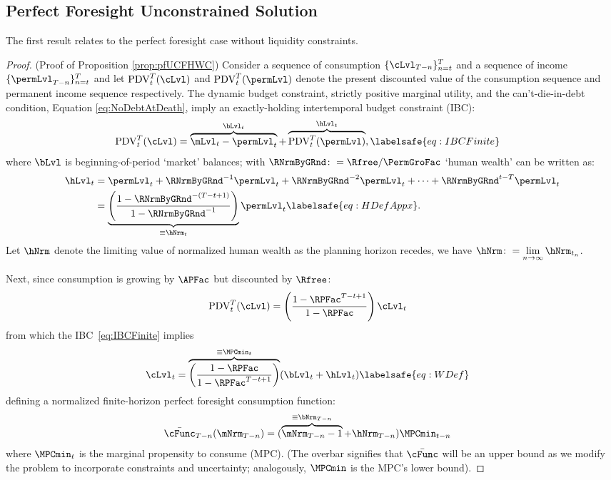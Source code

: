 \documentclass[\econtexRoot/BufferStockTheory]{subfiles}
\begin{document}
\subsection{Perfect Foresight Unconstrained Solution}\label{subsec:ApndxUCPF}

The first result relates to the perfect foresight case without liquidity constraints.


\begin{proof}(Proof of Proposition \ref{prop:pfUCFHWC})
Consider a sequence of consumption $\{\cLvl_{T-n}\}_{n= t}^{T}$ and a sequence of income $\{\permLvl_{T-n}\}_{n= t}^{T}$  and let $\mathrm{PDV}_{t}^{T}(\cLvl)$  and $\mathrm{PDV}_{t}^{T}(\permLvl)$ denote the present discounted value of the consumption sequence and permanent income sequence respectively.
The dynamic budget constraint, strictly positive marginal utility, and the can't-die-in-debt condition, Equation \eqref{eq:NoDebtAtDeath}, imply an exactly-holding intertemporal budget constraint (IBC):
%
%
\begin{align}
  \mathrm{PDV}_{t}^{T}(\cLvl)  & = \overbrace{\mLvl_{t}-\permLvl_{t}}^{\bLvl_{t}}+\overbrace{\mathrm{PDV}_{t}^{T}(\permLvl)}^{\hLvl_{t}}, \labelsafe{eq:IBCFinite}
\end{align} \hypertarget{FHWFacDefn}{}\hypertarget{PFRNrmByGRndDefn}{}
where $\bLvl$ is beginning-of-period `market' balances; with $\RNrmByGRnd \colon = \Rfree/\PermGroFac$ `human wealth' can be written as:
%
% 
\begin{align}
  \hLvl_{t}  & = \permLvl_{t}+\RNrmByGRnd^{-1} \permLvl_{t} + \RNrmByGRnd^{-2} \permLvl_{t} + \cdots + \RNrmByGRnd^{t-T} \permLvl_{t} \notag
  \\  & = \underbrace{\left(\frac{1-\RNrmByGRnd^{-(T-t+1)}}{1-\RNrmByGRnd^{-1}}\right)}_{\equiv \hNrm_{t}}\permLvl_{t} \labelsafe{eq:HDefAppx}.
\end{align}
%
%
Let $\hNrm$ denote the limiting value of normalized human wealth as the planning horizon recedes, we have  $\hNrm \colon = \lim\limits_{n \rightarrow \infty} \hNrm_{t_{n}}$.


Next, since consumption is growing by $\APFac$ but discounted by $\Rfree$:
\begin{align*}
  \mathrm{PDV}_{t}^{T}(\cLvl)  & = \left(\frac{1-\RPFac^{T-t+1}}{1-\RPFac}\right)\cLvl_{t}
\end{align*}
from which the IBC~\eqref{eq:IBCFinite} implies
\begin{align}
  \cLvl_{t}  & = \overbrace{\left(\frac{1-\RPFac}{1-\RPFac^{T-t+1}}\right)}^{\equiv \MPCmin_{t}}
               (\bLvl_{t}+\hLvl_{t})   \labelsafe{eq:WDef}
\end{align}
defining a normalized finite-horizon perfect foresight consumption function:\hypertarget{MPCminDefn}{}
%
%
\begin{align*}
  \bar{\cFunc}_{T-n}(\mNrm_{T-n})  & = (\overbrace{\mNrm_{T-n}-1}^{
                                     \equiv\bNrm_{T-n}}+\hNrm_{T-n})\MPCmin_{t-n}
\end{align*}
%
%
where $\MPCmin_{t}$ is the marginal propensity to consume (MPC).
(The overbar signifies that $\bar{\cFunc}$ will be an upper bound as we modify the problem to incorporate constraints and uncertainty; analogously, $\MPCmin$ is the MPC's lower bound).



\end{proof}
\end{document}
